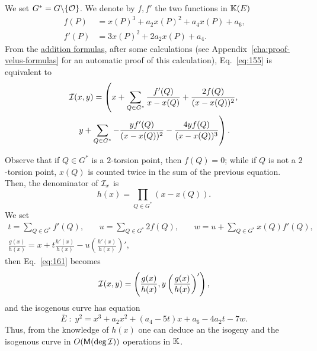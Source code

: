 We set $G^\ast=G\backslash\{\mathcal{O}\}$. We denote by $f,f'$ the two
functions in $\mathbb{K}(E)$
\begin{equation}
  \label{eq:162}
  \begin{aligned}
    f(P) &= x(P)^3 + a_2x(P)^2 + a_4x(P) + a_6
    \text{,}\\
    f'(P) &= 3x(P)^2 + 2a_2x(P) + a_4
    \text{.}
  \end{aligned}
\end{equation}
From the \hyperref[eq:121]{addition formulas}, after some calculations
(see Appendix~\ref{cha:proof-velus-formulas} for an automatic proof of
this calculation), Eq.~\eqref{eq:155} is equivalent to
\begin{multline}
  \label{eq:161}
  \mathcal{I}(x,y) = \left(x + \sum_{Q\in G^\ast} \frac{f'(Q)}{x-x(Q)} + \frac{2f(Q)}{(x-x(Q))^2}\text{,}\right.\\
  \left.y + \sum_{Q\in G^\ast} -\frac{yf'(Q)}{(x-x(Q))^2} - \frac{4yf(Q)}{(x-x(Q))^3}\right)
  \text{.}
\end{multline}

Observe that if $Q\in G^\ast$ is a $2$-torsion point, then $f(Q)=0$;
while if $Q$ is not a $2$-torsion point, $x(Q)$ is counted twice in
the sum of the previous equation. Then, the denominator of $\mathcal{I}_x$ is
  \begin{equation}
    \label{eq:158}
    h(x) = \prod_{Q\in G^\ast}(x - x(Q))
    \text{.}
  \end{equation}
We set
\begin{equation}
  \label{eq:164}
  \begin{gathered}
    t = \sum_{Q\in G^\ast} f'(Q)\text{,}
    \qquad
    u = \sum_{Q\in G^\ast} 2f(Q)\text{,}
    \qquad
    w = u + \sum_{Q\in G^\ast} x(Q)f'(Q)\text{,}\\
    \frac{g(x)}{h(x)} = x + t\frac{h'(x)}{h(x)} - u\left(\frac{h'(x)}{h(x)}\right)'
    \text{,}
  \end{gathered}
\end{equation}
then Eq.~\eqref{eq:161} becomes
\begin{equation}
  \label{eq:159}
  \mathcal{I}(x,y) = \left(\frac{g(x)}{h(x)}, y\left(\frac{g(x)}{h(x)}\right)'\right)
  \text{,}
\end{equation}
and the isogenous curve has equation
\begin{equation}
  \label{eq:163}
  \bar{E}\;:\;y^2 = x^3 + a_2x^2 + (a_4-5t)x + a_6 - 4a_2t - 7w
  \text{.}
\end{equation}
Thus, from the knowledge of $h(x)$ one can deduce an the isogeny and
the isogenous curve in $O(\mathsf{M}(\deg\mathcal{I}))$ operations in $\mathbb{K}$.

